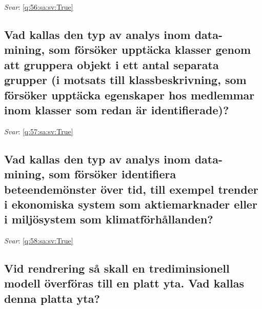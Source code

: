 \documentclass[a4paper,11pt,oneside]{article}
\begin{document}
\begin{sloppypar}
\textit{Svar}: \autoref{q:56:sa:sv:True}



\subsection{Vad kallas den typ av analys inom data-mining, som f\"ors\"oker uppt\"acka klasser genom att gruppera objekt i ett antal separata grupper (i motsats till klassbeskrivning, som f\"ors\"oker uppt\"acka egenskaper hos medlemmar inom klasser som redan \"ar identifierade)?}

\label{q:57:sa:sv:False}

\vspace{2cm}

\noindent\makebox[\textwidth]{\hrulefill}

\vspace{1cm}

\textit{Svar}: \autoref{q:57:sa:sv:True}



\subsection{Vad kallas den typ av analys inom data-mining, som f\"ors\"oker identifiera beteendem\"onster \"over tid, till exempel trender i ekonomiska system som aktiemarknader eller i milj\"osystem som klimatf\"orh\r{a}llanden?}

\label{q:58:sa:sv:False}

\vspace{2cm}

\noindent\makebox[\textwidth]{\hrulefill}

\vspace{1cm}

\textit{Svar}: \autoref{q:58:sa:sv:True}



\subsection{Vid rendrering s\r{a} skall en trediminsionell modell \"overf\"oras till en platt yta. Vad kallas denna platta yta?}

\label{q:59:sa:sv:False}

\vspace{2cm}

\noindent\makebox[\textwidth]{\hrulefill}

\vspace{1cm}


\end{sloppypar}
\end{document}

